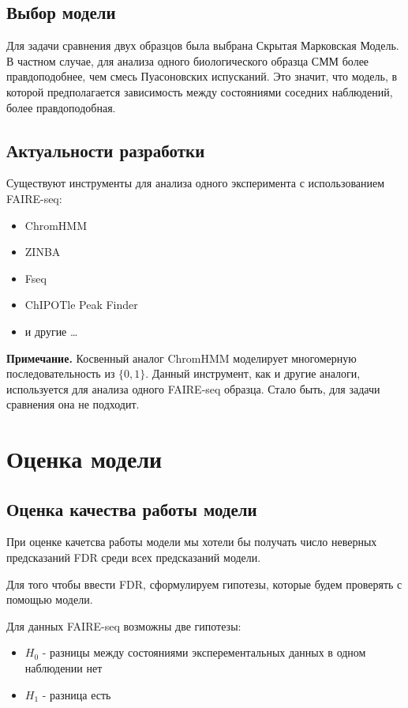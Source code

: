 \documentclass{matmex-diploma}
\begin{document}
\subsection{Выбор модели}
Для задачи сравнения двух образцов была выбрана Скрытая Марковская Модель.
В частном случае, для анализа одного биологического образца СММ более правдоподобнее, чем смесь Пуасоновских испусканий.
Это значит, что модель, в которой предполагается зависимость между состояниями соседних наблюдений, более правдоподобная.

\subsection{Актуальности разработки}

Существуют инструменты для анализа одного эксперимента с использованием FAIRE-seq:

\begin{itemize}
  \item ChromHMM
  \item ZINBA
  \item Fseq
  \item ChIPOTle Peak Finder 
  \item и другие \ldots
\end{itemize}

\textbf{Примечание.} Косвенный аналог ChromHMM моделирует многомерную последовательность из $\{0, 1\}$. Данный инструмент, как и другие аналоги, используется для анализа одного FAIRE-seq образца. Стало быть, для задачи сравнения она не подходит. 
\section{Оценка модели}

\subsection{Оценка качества работы модели}

При оценке качетсва работы модели мы хотели бы получать число неверных предсказаний FDR\cite{wiki:fdr} среди всех предсказаний модели.

Для того чтобы ввести FDR, сформулируем гипотезы, которые будем проверять с помощью модели. 

Для данных FAIRE-seq возможны две гипотезы:
\begin{itemize}
  \item $H_0$ - разницы между состояниями эксперементальных данных в одном наблюдении нет
  \item $H_1$ - разница есть
\end{itemize}
\end{document}

